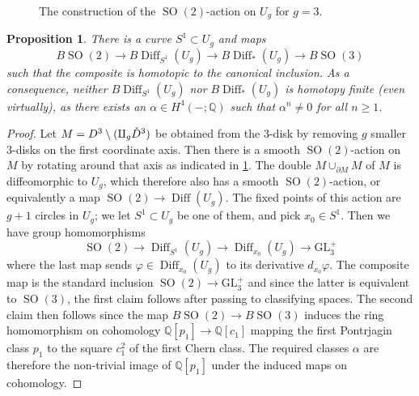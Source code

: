 \documentclass{amsart}
\theoremstyle{plain}
\newtheorem{prop}[thm]{Proposition}
\theoremstyle{definition}
\DeclareMathOperator\Diff{Diff}
\DeclareMathOperator\SO{SO}
\newcommand{\interior}[1]{\smash{\mathring{#1}}}
\newcommand{\BDiff}{B\!\Diff}
\newcommand{\bbQ}{\mathbb{Q}}
\begin{document}
\begin{figure}[ht!]
    \centering
    \caption{The construction of the $\SO(2)$-action on $U_g$ for $g=3$.}
    \label{fig:rotation}
\end{figure}

\begin{prop}\label{prop:circle-action-on-Ug}
    There is a curve $S^1 \subset U_g$ and maps
    \[
        B\!\SO(2) \longrightarrow \BDiff_{S^1}(U_g) \longrightarrow \BDiff_*(U_g) \longrightarrow B\!\SO(3)
    \]
    such that the composite is homotopic to the canonical inclusion.
    As a consequence, neither $\BDiff_{S^1}(U_g)$ nor $\BDiff_*(U_g)$ is homotopy finite (even virtually), as there exists an $\alpha \in H^4(-;\bbQ)$ such that $\alpha^n \neq 0$ for all $n\ge1$.
\end{prop}
\begin{proof}
    Let $M = D^3 \setminus (\amalg_g \interior{D}^3)$ be obtained from the $3$-disk by removing $g$ smaller $3$-disks on the first coordinate axis.
    Then there is a smooth $\SO(2)$-action on $M$ by rotating around that axis as indicated in \cref{fig:rotation}.
    The double $M \cup_{\partial M} M$ of $M$ is diffeomorphic to $U_g$, which therefore also has a smooth $\SO(2)$-action, or equivalently a map $\SO(2) \to \Diff(U_g)$.
    The fixed points of this action are $g+1$ circles in $U_g$; we let $S^1 \subset U_g$ be one of them, and pick $x_0 \in S^1$.
    Then we have group homomorphisms
    \[
        \SO(2) \to \Diff_{S^1}(U_g) \to \Diff_{x_0}(U_g) \to \mathrm{GL}_3^+
    \]
    where the last map sends $\varphi \in \Diff_{x_0}(U_g)$ to its derivative $d_{x_0}\varphi$.
    The composite map is the standard inclusion $\SO(2) \to \mathrm{GL}_3^+$ and since the latter is equivalent to $\SO(3)$, the first claim follows after passing to classifying spaces.
    The second claim then follows since the map $B\!\SO(2) \to B\!\SO(3)$ induces the ring homomorphism on cohomology
    $\bbQ[p_1] \longrightarrow \bbQ[c_1]$ 
    mapping the first Pontrjagin class $p_1$ to the square $c_1^2$ of the first Chern class. The required classes $\alpha$ are therefore the non-trivial image of $\bbQ[p_1]$ under the induced maps on cohomology. 
\end{proof}



{}

\end{document}
